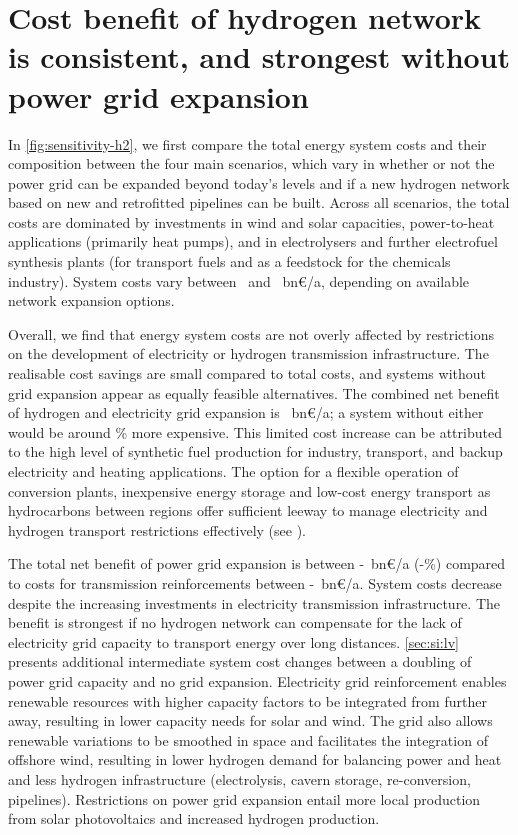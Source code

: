 \section*{Cost benefit of hydrogen network is consistent, and strongest without power grid expansion}
\label{sec:h2}

In \cref{fig:sensitivity-h2}, we first compare the total energy system costs and
their composition between the four main scenarios, which vary in whether or not
the power grid can be expanded beyond today's levels and if a new hydrogen
network based on new and retrofitted pipelines can be built. Across all
scenarios, the total costs are dominated by investments in wind and solar
capacities, power-to-heat applications (primarily heat pumps), and in
electrolysers and further electrofuel synthesis plants (for transport fuels and
as a feedstock for the chemicals industry). System costs vary between
\minsystemcost~and \maxsystemcost~bn\euro/a, depending on available network
expansion options.

Overall, we find that energy system costs are not overly affected by restrictions on
the development of electricity or hydrogen transmission infrastructure. The
realisable cost savings are small compared to total costs, and systems
without grid expansion appear as equally feasible alternatives. The
combined net benefit of hydrogen and electricity grid expansion is
\gridbenefitabs~bn\euro/a; a system without either would be around
\gridbenefitrel\% more expensive. This limited cost increase can be attributed
to the high level of synthetic fuel production for industry, transport, and
backup electricity and heating applications. The option for a flexible operation
of conversion plants, inexpensive energy storage and low-cost energy transport as
hydrocarbons between regions offer sufficient leeway to manage electricity and
hydrogen transport restrictions effectively (see ).

The total net benefit of power grid expansion is between
\minacbenefitabs-\maxacbenefitabs~bn\euro/a
(\minacbenefitrel-\maxacbenefitrel\%) compared to costs for transmission
reinforcements between \minaccost-\maxaccost~bn\euro/a. System costs decrease
despite the increasing investments in electricity transmission infrastructure.
The benefit is strongest if no hydrogen network can compensate for the lack of
electricity grid capacity to transport energy over long distances.
\cref{sec:si:lv} presents additional intermediate system cost changes between a
doubling of power grid capacity and no grid expansion. Electricity grid
reinforcement enables renewable resources with higher capacity factors to be
integrated from further away, resulting in lower capacity needs for solar and
wind. The grid also allows renewable variations to be smoothed in space and
facilitates the integration of offshore wind, resulting in lower hydrogen demand
for balancing power and heat and less hydrogen infrastructure (electrolysis,
cavern storage, re-conversion, pipelines). Restrictions on power grid expansion
entail more local production from solar photovoltaics and increased hydrogen
production.

